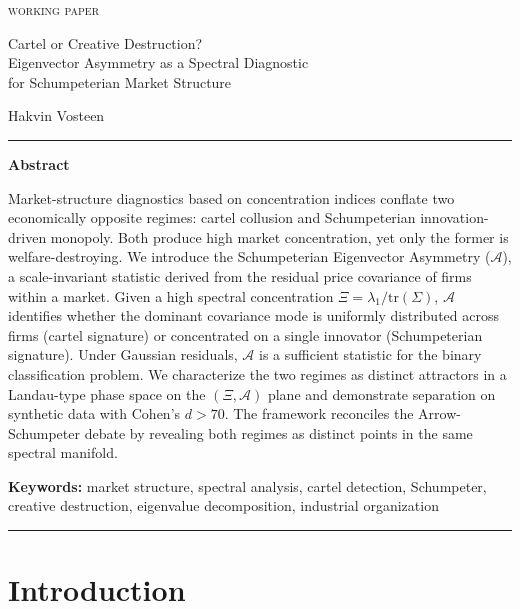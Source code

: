 \documentclass[12pt,a4paper]{article}
\newcommand{\SEA}{\mathcal{A}}
\begin{document}
{\small\scshape working paper}

\vspace{0.8cm}

{\LARGE Cartel or Creative Destruction?\\[4pt]
Eigenvector Asymmetry as a Spectral Diagnostic\\[4pt]
for Schumpeterian Market Structure}

\vspace{0.7cm}

Hakvin Vosteen

\vspace{0.6cm}

\noindent\rule{\textwidth}{0.4pt}

\textbf{Abstract}

\vspace{0.2em}

Market-structure diagnostics based on concentration indices conflate two economically opposite regimes: cartel collusion and Schumpeterian innovation-driven monopoly. Both produce high market concentration, yet only the former is welfare-destroying. We introduce the Schumpeterian Eigenvector Asymmetry ($\SEA$), a scale-invariant statistic derived from the residual price covariance of firms within a market. Given a high spectral concentration $\Xi = \lambda_1 / \mathrm{tr}(\Sigma)$, $\SEA$ identifies whether the dominant covariance mode is uniformly distributed across firms (cartel signature) or concentrated on a single innovator (Schumpeterian signature). Under Gaussian residuals, $\SEA$ is a sufficient statistic for the binary classification problem. We characterize the two regimes as distinct attractors in a Landau-type phase space on the $(\Xi, \SEA)$ plane and demonstrate separation on synthetic data with Cohen's $d > 70$. The framework reconciles the Arrow-Schumpeter debate by revealing both regimes as distinct points in the same spectral manifold.

\vspace{0.4em}

{\small\textbf{Keywords:} market structure, spectral analysis, cartel detection, Schumpeter, creative destruction, eigenvalue decomposition, industrial organization}

\noindent\rule{\textwidth}{0.4pt}

\vspace{0.5cm}

\section{Introduction}
\label{sec:intro}
\end{document}
